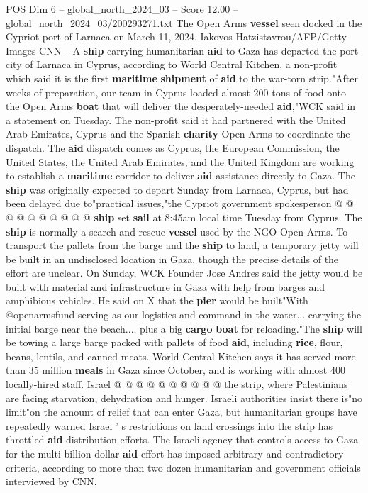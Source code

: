 \begin{textsample}{POS Dim 6 – global\_north\_2024\_03 – Score 12.00 – global\_north\_2024\_03/200293271.txt}  \label{ex:f6_pos_050}
The Open Arms \textbf{vessel} seen docked in the Cypriot port of Larnaca on March 11, 2024.
Iakovos Hatzistavrou/AFP/Getty Images CNN -- A \textbf{ship} carrying humanitarian \textbf{aid} to Gaza has departed the port city of Larnaca in Cyprus, according to World Central Kitchen, a non-profit which said it is the first \textbf{maritime} \textbf{shipment} of \textbf{aid} to the war-torn strip."After weeks of preparation, our team in Cyprus loaded almost 200 tons of food onto the Open Arms \textbf{boat} that will deliver the desperately-needed \textbf{aid},"WCK said in a statement on Tuesday.
The non-profit said it had partnered with the United Arab Emirates, Cyprus and the Spanish \textbf{charity} Open Arms to coordinate the dispatch.
The \textbf{aid} dispatch comes as Cyprus, the European Commission, the United States, the United Arab Emirates, and the United Kingdom are working to establish a \textbf{maritime} corridor to deliver \textbf{aid} assistance directly to Gaza.
The \textbf{ship} was originally expected to depart Sunday from Larnaca, Cyprus, but had been delayed due to"practical issues,"the Cypriot government spokesperson @ @ @ @ @ @ @ @ @ @ \textbf{ship} set \textbf{sail} at 8:45am local time Tuesday from Cyprus.
The \textbf{ship} is normally a search and rescue \textbf{vessel} used by the NGO Open Arms.
To transport the pallets from the barge and the \textbf{ship} to land, a temporary jetty will be built in an undisclosed location in Gaza, though the precise details of the effort are unclear.
On Sunday, WCK Founder Jose Andres said the jetty would be built with material and infrastructure in Gaza with help from barges and amphibious vehicles.
He said on X that the \textbf{pier} would be built"With @openarmsfund serving as our logistics and command in the water... carrying the initial barge near the beach.... plus a big \textbf{cargo} \textbf{boat} for reloading."The \textbf{ship} will be towing a large barge packed with pallets of food \textbf{aid}, including \textbf{rice}, flour, beans, lentils, and canned meats.
World Central Kitchen says it has served more than 35 million \textbf{meals} in Gaza since October, and is working with almost 400 locally-hired staff.
Israel @ @ @ @ @ @ @ @ @ @ the strip, where Palestinians are facing starvation, dehydration and hunger.
Israeli authorities insist there is"no limit"on the amount of relief that can enter Gaza, but humanitarian groups have repeatedly warned Israel ' s restrictions on land crossings into the strip has throttled \textbf{aid} distribution efforts.
The Israeli agency that controls access to Gaza for the multi-billion-dollar \textbf{aid} effort has imposed arbitrary and contradictory criteria, according to more than two dozen humanitarian and government officials interviewed by CNN.

\end{textsample}
